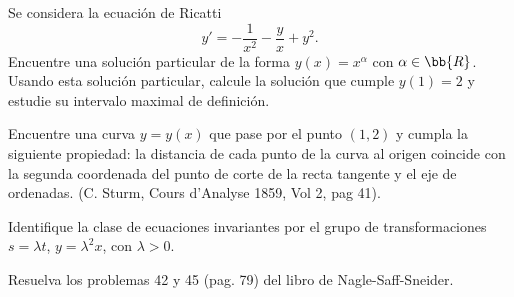 \begin{ejercicio}
    Se considera la ecuación de Ricatti
    \begin{equation*}
        y' = -\dfrac{1}{x^2} - \dfrac{y}{x} + y^2.
    \end{equation*}
    Encuentre una solución particular de la forma $y(x) = x^\alpha$ con $\alpha \in \bb{R}$. Usando esta solución particular, calcule la solución que cumple $y(1) = 2$ y estudie su intervalo maximal de definición.
\end{ejercicio}

\begin{ejercicio}
    Encuentre una curva $y = y(x)$ que pase por el punto $(1, 2)$ y cumpla la siguiente propiedad: la distancia de cada punto de la curva al origen coincide con la segunda coordenada del punto de corte de la recta tangente y el eje de ordenadas. (C. Sturm, Cours d’Analyse 1859, Vol 2, pag 41).
\end{ejercicio}

\begin{ejercicio}
    Identifique la clase de ecuaciones invariantes por el grupo de transformaciones $s = \lambda t$, $y = \lambda^2 x$, con $\lambda > 0$.
\end{ejercicio}

\begin{ejercicio}
    Resuelva los problemas 42 y 45 (pag. 79) del libro de Nagle-Saff-Sneider.
\end{ejercicio}